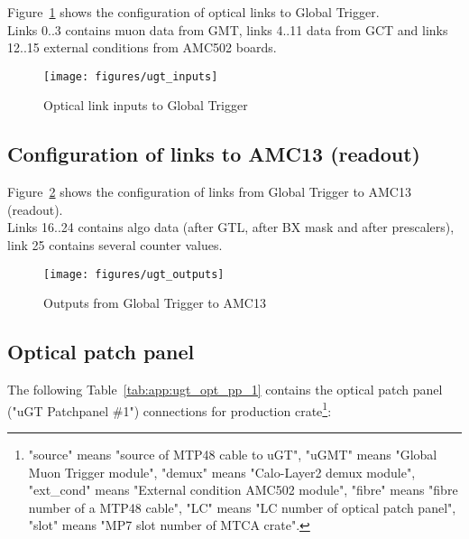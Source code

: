 Figure~\ref{fig:app:ugt_inputs} shows the configuration of optical links to Global Trigger.\\
Links 0..3 contains muon data from GMT, links 4..11 data from GCT and links 12..15 external conditions
from AMC502 boards.

\begin{figure}[htb]
\centering
\texttt{[image: figures/ugt\_inputs]}
\caption{Optical link inputs to Global Trigger}
\label{fig:app:ugt_inputs}
\end{figure}

\subsection{Configuration of links to AMC13 (readout)}\label{sec:app:app_c}

Figure~\ref{fig:app:ugt_outputs} shows the configuration of links from Global Trigger to AMC13 (readout).\\
Links 16..24 contains algo data (after GTL, after BX mask and after prescalers), link 25 contains several counter values.

\begin{figure}[htb]
\centering
\texttt{[image: figures/ugt\_outputs]}
\caption{Outputs from Global Trigger to AMC13}
\label{fig:app:ugt_outputs}
\end{figure}

\clearpage

\subsection{Optical patch panel}\label{sec:app:app_d}

The following Table~\ref{tab:app:ugt_opt_pp_1} contains the optical patch panel ("uGT Patchpanel \#1") connections for production crate\footnote{"source" means "source of MTP48 cable to uGT", "uGMT" means "Global Muon Trigger module", "demux" means "Calo-Layer2 demux module", "ext\_cond" means "External condition AMC502 module", "fibre" means "fibre number of a MTP48 cable", "LC" means "LC number of optical patch panel", "slot" means "MP7 slot number of MTCA crate".\label{note_ugt_opt_pp_1}}:

